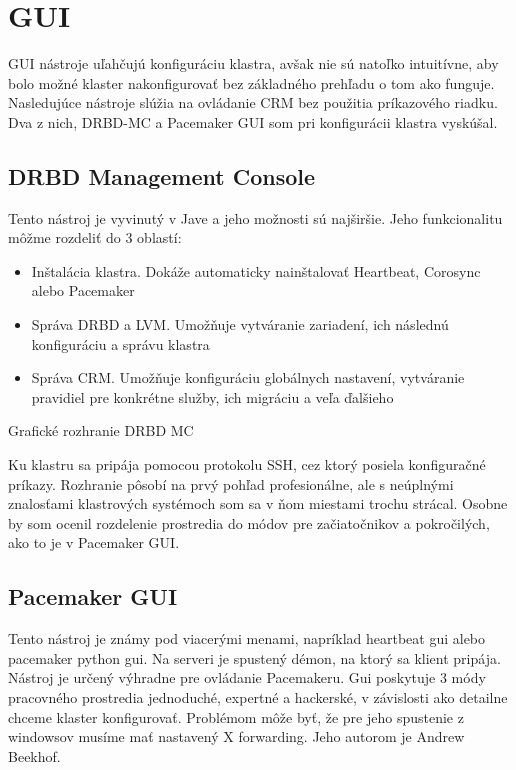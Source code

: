 \section{GUI}
\label{lbl:sec:gui}
GUI nástroje uľahčujú konfiguráciu klastra, avšak nie sú natoľko intuitívne, aby bolo možné klaster nakonfigurovať bez základného prehľadu o tom ako funguje. Nasledujúce nástroje slúžia na ovládanie \ac{CRM} bez použitia príkazového riadku. Dva z nich, DRBD-MC a Pacemaker GUI som pri konfigurácii klastra vyskúšal.

\subsection{DRBD Management Console}
Tento nástroj je vyvinutý v Jave a jeho možnosti sú najširšie. Jeho funkcionalitu môžme rozdeliť do 3 oblastí:

\begin{itemize}
	\item Inštalácia klastra. Dokáže automaticky nainštalovať Heartbeat, Corosync alebo Pacemaker
	\item Správa DRBD a LVM. Umožňuje vytváranie zariadení, ich následnú konfiguráciu a správu klastra
	\item Správa CRM. Umožňuje konfiguráciu globálnych nastavení, vytváranie pravidiel pre konkrétne služby, ich migráciu a veľa ďalšieho
\end{itemize}

 {Grafické rozhranie DRBD MC}

Ku klastru sa pripája pomocou protokolu SSH, cez ktorý posiela konfiguračné príkazy. Rozhranie pôsobí na prvý pohľad profesionálne, ale s neúplnými znalosťami klastrových systémoch som sa v ňom miestami trochu strácal. Osobne by som ocenil rozdelenie prostredia do módov pre začiatočnikov a pokročilých, ako to je v Pacemaker GUI.

\subsection{Pacemaker GUI}
Tento nástroj je známy pod viacerými menami, napríklad heartbeat gui alebo pacemaker python gui. Na serveri je spustený démon, na ktorý sa klient pripája. Nástroj je určený výhradne pre ovládanie Pacemakeru. Gui poskytuje 3 módy pracovného prostredia jednoduché, expertné a hackerské, v závislosti ako detailne chceme klaster konfigurovať. Problémom môže byť, že pre jeho spustenie z windowsov musíme mať nastavený X forwarding. Jeho autorom je Andrew Beekhof.

